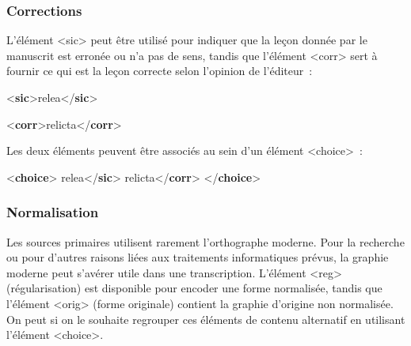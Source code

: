 \documentclass[]{beamer}\makeatletter
\begin{document}
\begin{frame}[fragile]
\frametitle{Corrections}\par
L’élément {\color{blue2}<sic>} peut être utilisé pour indiquer que la leçon      donnée par le manuscrit est erronée ou n’a pas de sens, tandis que      l’élément {\color{blue2}<corr>} sert à fournir ce qui est la leçon correcte      selon l’opinion de l’éditeur : 
\bgroup\ttfamily\fontsize{8.5pt}{9pt}\selectfont\par
\begin{exampleblock}{}
\noindent\ttfamily\mbox{}{\color{blue1}<\textbf{sic}>}relea{\color{blue1}</\textbf{sic}>}
\end{exampleblock}
\par\egroup
        
\bgroup\ttfamily\fontsize{8.5pt}{9pt}\selectfont\par
\begin{exampleblock}{}
\noindent\ttfamily\mbox{}{\color{blue1}<\textbf{corr}>}relicta{\color{blue1}</\textbf{corr}>}
\end{exampleblock}
\par\egroup
       \par
Les deux éléments peuvent être associés au sein d’un élément       {\color{blue2}<choice>} : 
\bgroup\ttfamily\fontsize{8.5pt}{9pt}\selectfont\par
\begin{exampleblock}{}
\noindent\ttfamily\mbox{}{\color{blue1}<\textbf{choice}>}\mbox{}\newline 
{}relea{\color{blue1}</\textbf{sic}>}\mbox{}\newline 
{}relicta{\color{blue1}</\textbf{corr}>}\mbox{}\newline 
{\color{blue1}</\textbf{choice}>}
\end{exampleblock}
\par\egroup
       
\end{frame}

\begin{frame}
\frametitle{Normalisation}\par
Les sources primaires utilisent rarement l’orthographe     moderne. Pour      la recherche ou pour d’autres raisons liées aux traitements      informatiques prévus, la graphie moderne peut s’avérer utile dans une      transcription. L’élément {\color{blue2}<reg>} (régularisation) est disponible pour encoder une forme normalisée,      tandis que l’élément {\color{blue2}<orig>} (forme originale) contient la      graphie d’origine non normalisée. On peut si on le souhaite regrouper      ces éléments de contenu alternatif en utilisant l’élément       {\color{blue2}<choice>}.
\end{frame}
\end{document}
